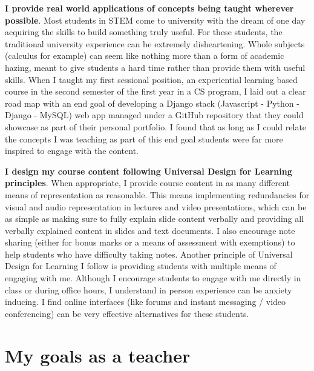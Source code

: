 \documentclass[12pt]{report}
\begin{document}
\noindent
\textbf{I provide real world applications of concepts being taught wherever
possible}. Most students in STEM come to university with the dream of one day
acquiring the skills to build something truly useful. For these students, the
traditional university experience can be extremely disheartening. Whole
subjects (calculus for example) can seem like nothing more than a form of
academic hazing, meant to give students a hard time rather than provide them
with useful skills. When I taught my first sessional position, an experiential
learning based course in the second semester of the first year in a CS
program, I laid out a clear road map with an end goal of developing a Django
stack (Javascript - Python - Django - MySQL) web app managed under a GitHub
repository that they could showcase as part of their personal portfolio. I
found that as long as I could relate the concepts I was teaching as part of
this end goal students were far more inspired to engage with the content.

\noindent
\textbf{I design my course content following Universal Design for Learning
principles}. When appropriate, I provide course content in as many different
means of representation as reasonable. This means implementing redundancies
for visual and audio representation in lectures and video presentations, which
can be as simple as making sure to fully explain slide content verbally and
providing all verbally explained content in slides and text documents. I also
encourage note sharing (either for bonus marks or a means of assessment with
exemptions) to help students who have difficulty taking notes. Another
principle of Universal Design for Learning I follow is providing students with
multiple means of engaging with me. Although I encourage students to engage
with me directly in class or during office hours, I understand in person
experience can be anxiety inducing. I find online interfaces (like forums and
instant messaging / video conferencing) can be very effective alternatives for
these students.

\section{My goals as a teacher}
\label{sec:org7925636}
\end{document}
